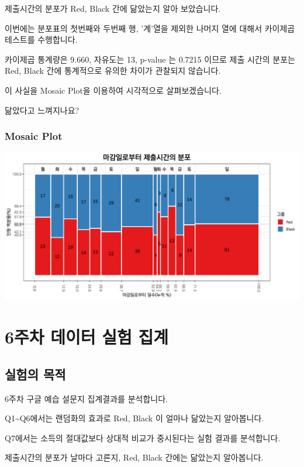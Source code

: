 \documentclass[
]{book}
\begin{document}
제출시간의 분포가 Red, Black 간에 닮았는지 알아 보았습니다.

이번에는 분포표의 첫번째와 두번째 행, '계'열을 제외한 나머지 열에 대해서 카이제곱테스트를 수행합니다.

카이제곱 통계량은 9.660, 자유도는 13, p-value 는 0.7215 이므로 제출 시간의 분포는 Red, Black 간에 통계적으로 유의한 차이가 관찰되지 않습니다.

이 사실을 Mosaic Plot을 이용하여 시각적으로 살펴보겠습니다.

닮았다고 느껴지나요?

\subsection{Mosaic Plot}\label{mosaic-plot-9}

\includegraphics{_main_files/figure-latex/unnamed-chunk-133-1.pdf}

\chapter{6주차 데이터 실험 집계}\label{uxc8fcuxcc28-uxb370uxc774uxd130-uxc2e4uxd5d8-uxc9d1uxacc4-5}

\section{실험의 목적}\label{uxc2e4uxd5d8uxc758-uxbaa9uxc801-5}

6주차 구글 예습 설문지 집계결과를 분석합니다.

Q1\textasciitilde Q6에서는 랜덤화의 효과로 Red, Black 이 얼마나 닮았는지 알아봅니다.

Q7에서는 소득의 절대값보다 상대적 비교가 중시된다는 실험 결과를 분석합니다.

제출시간의 분포가 날마다 고른지, Red, Black 간에는 닮았는지 알아봅니다.
\end{document}
